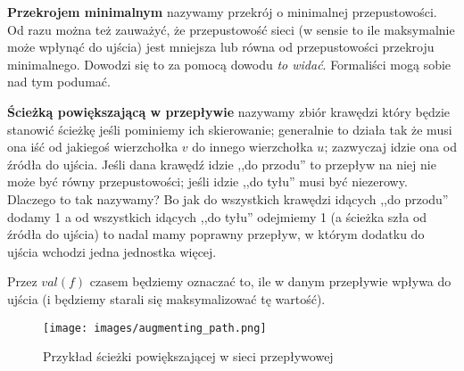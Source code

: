 \textbf{Przekrojem minimalnym} nazywamy przekrój o minimalnej przepustowości. Od razu można też zauważyć, że przepustowość sieci (w sensie to ile maksymalnie może wpłynąć do ujścia) jest mniejsza lub równa od przepustowości przekroju minimalnego. Dowodzi się to za pomocą dowodu \textit{to widać}. Formaliści mogą sobie nad tym podumać.

\textbf{Ścieżką powiększającą w przepływie} nazywamy zbiór krawędzi który będzie stanowić ścieżkę jeśli pominiemy ich skierowanie; generalnie to działa tak że musi ona iść od jakiegoś wierzchołka \(v\) do innego wierzchołka \(u\); zazwyczaj idzie ona od źródła do ujścia. Jeśli  dana krawędź idzie ,,do przodu'' to przepływ na niej nie może być równy przepustowości; jeśli idzie ,,do tyłu'' musi być niezerowy. Dlaczego to tak nazywamy? Bo jak do wszystkich krawędzi idących ,,do przodu'' dodamy 1 a od wszystkich idących ,,do tyłu'' odejmiemy 1 (a ścieżka szła od źródła do ujścia) to nadal mamy poprawny przepływ, w którym dodatku do ujścia wchodzi jedna jednostka więcej.

Przez \(val(f)\) czasem będziemy oznaczać to, ile w danym przepływie wpływa do ujścia (i będziemy starali się maksymalizować tę wartość).

\begin{figure}[H]
	\centering
	\texttt{[image: images/augmenting\_path.png]}
	\caption{Przykład ścieżki powiększającej w sieci przepływowej}
\end{figure}